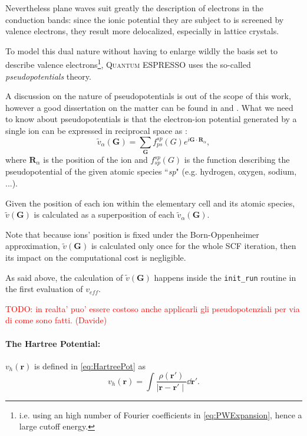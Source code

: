 \documentclass[a4paper,12pt]{article}
\newcommand\mynotes[1]{\begin{flushright}

\textcolor{red}{TODO: #1}\end{flushright}}
\newcommand\mf[1]{\mathbf{#1}}
\newcommand\erre{\mathbf{r}}
\newcommand\GI{\mathbf{G}}
\newcommand\QE{\textsc{Quantum} ESPRESSO }
\begin{document}
Nevertheless plane waves suit greatly the description of electrons in the conduction bands: since the ionic potential they are subject to is screened by valence electrons\cite[p.136]{Manini}, they result more delocalized, especially in lattice crystals.

To model this dual nature without having to enlarge wildly the basis set to describe valence electrons\footnote{i.e. using an high number of Fourier coefficients in \eqref{eq:PWExpansion}, hence a large cutoff energy.}, \QE uses the so-called \textit{pseudopotentials} theory.

A discussion on the nature of pseudopotentials is out of the scope of this work, however a good dissertation on the matter can be found in \cite[chap. 11]{Martin} and \cite[p.90]{Marx}.
What we need to know about pseudopotentials is that the electron-ion potential generated by a single ion can be expressed in reciprocal space as :
\begin{equation}
	\tilde{v}_{\alpha}(\mf{G}) = \sum_{\mf{G}} f_{ps}^{sp}(G) e^{i \mf{G} \cdot \mf{R}_{\alpha}},
\end{equation}
where  $\mf{R}_{\alpha}$ is the position of the ion and $f_{sp}^{sp}(G)$ is the function describing the pseudopotential of the given atomic species ``\textit{sp}" (e.g. hydrogen, oxygen, sodium, ...).

Given the position of each ion within the elementary cell and its atomic species, $\tilde{v}(\mf{G})$ is calculated as a superposition of each $\tilde{v}_{\alpha}(\mf{G})$.

Note that because ions' position is fixed under the Born-Oppenheimer approximation, $\tilde{v}(\mf{G})$ is calculated only once for the whole SCF iteration, then its impact on the computational cost is negligible.  

As said above, the calculation of $\tilde{v}(\GI)$ happens inside the \texttt{init\_run} routine in the first evaluation of $v_{eff}$.

\mynotes{in realta' puo' essere costoso anche applicarli gli pseudopotenziali per via di come sono fatti. (Davide)}

\paragraph{The Hartree Potential:}

$v_{h}(\erre)$ is defined in \eqref{eq:HartreePot} as 
\begin{equation}
 v_{h}(\erre) = \int \frac{\rho(\mathbf{r'})}{\mid \mathbf{r} - \mathbf{r'} \mid}  \dd{\mathbf{r'}}.
\end{equation}
\end{document}
